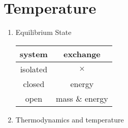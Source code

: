 \documentclass[10.5pt, a4paper, oneside]{article}
\numberwithin{equation}{section}%
\begin{document}
\section{Temperature}
\begin{multicols}{2}
	\begin{enumerate}
		\item Equilibrium State
			\begin{center}
					\begin{tabular}{|c|c|}
					\hline
					system & exchange \\
					\hline
					isolated & $\times$ \\
					\hline
					closed & energy \\
					\hline
					open & mass \& energy \\
					\hline
				\end{tabular}
			\end{center}
		\item Thermodynamics and temperature

\end{enumerate}
\end{multicols}
\end{document}
